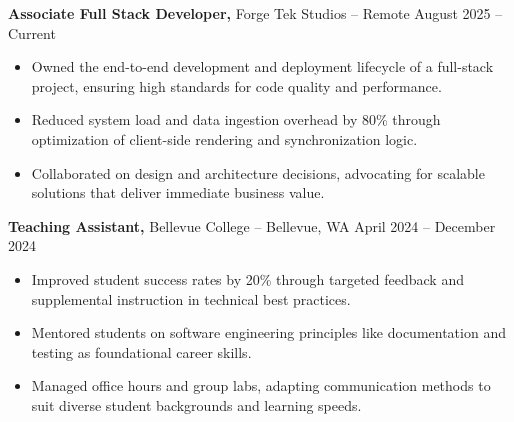 \documentclass[11pt]{article}       %
\begin{document}
\textbf{Associate Full Stack Developer,} {Forge Tek Studios} -- Remote \hfill August 2025 -- Current 
\vspace{-9pt}
\begin{itemize}
  \item Owned the end-to-end development and deployment lifecycle of a full-stack project, ensuring high standards for code quality and performance.
  \item Reduced system load and data ingestion overhead by 80\% through optimization of client-side rendering and synchronization logic.
  \item Collaborated on design and architecture decisions, advocating for scalable solutions that deliver immediate business value.
\end{itemize}

\textbf{Teaching Assistant,} {Bellevue College} -- Bellevue, WA \hfill April 2024 -- December 2024 \\
\vspace{-9pt}
\begin{itemize}
  \item Improved student success rates by 20\% through targeted feedback and supplemental instruction in technical best practices.
  \item Mentored students on software engineering principles like documentation and testing as foundational career skills.
  \item Managed office hours and group labs, adapting communication methods to suit diverse student backgrounds and learning speeds.
\end{itemize}

\end{document}
